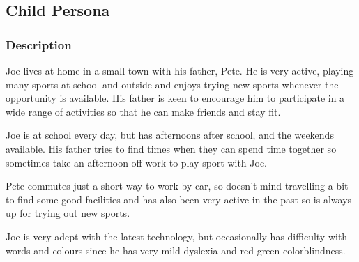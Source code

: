 \subsection{Child Persona}
\label{sub:child_persona}


\subsubsection*{Description}
\label{ssub:child_description}

Joe lives at home in a small town with his father, Pete. He is very active,
playing many sports at school and outside and enjoys trying new sports whenever
the opportunity is available. His father is keen to encourage him to
participate in a wide range of activities so that he can make friends and stay
fit.

Joe is at school every day, but has afternoons after school, and the weekends
available. His father tries to find times when they can spend time together so
sometimes take an afternoon off work to play sport with Joe.

Pete commutes just a short way to work by car, so doesn't mind travelling a bit
to find some good facilities and has also been very active in the past so is
always up for trying out new sports.

Joe is very adept with the latest technology, but occasionally has difficulty
with words and colours since he has very mild dyslexia and red-green
colorblindness.

